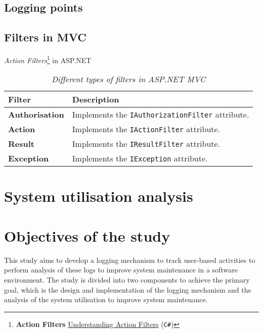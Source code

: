 \subsection{Logging points}\label{sec:Ch1_LoggignPoints}

\subsection{Filters in MVC}\label{sec:Ch1_FiltersMVC}

\emph{Action Filters}\cprotect\footnote{\textbf{Action Filters} \href{https://docs.microsoft.com/en-us/aspnet/mvc/overview/older-versions-1/controllers-and-routing/understanding-action-filters-cs}{Understanding Action Filters} (\verb|C#|)} in ASP.NET

\begin{table}[!htb]
	\centering
	\small
	\caption[Different types of filters in ASP.NET MVC]
	{\textit{Different types of filters in ASP.NET MVC}}
	\label{tbl:Ch1_ASPFilters}
	\begin{tabularx}{\textwidth}{|l|X|}
		\hline \textbf{Filter} & \textbf{Description} \\
		\hline \textbf{Authorisation} & Implements the \texttt{IAuthorizationFilter} attribute. \\
		\hline \textbf{Action} & Implements the \texttt{IActionFilter} attribute. \\
		\hline \textbf{Result} & Implements the \texttt{IResultFilter} attribute. \\
		\hline \textbf{Exception} & Implements the \texttt{IException} attribute. \\
		\hline
	\end{tabularx}
\end{table}

\clearpage

\section{System utilisation analysis}\label{sec:SystemUtilisation}

\clearpage

\section{Objectives of the study}
This study aims to develop a logging mechanism to track user-based activities to perform analysis of these logs to improve system maintenance in a software environment. The study is divided into two components to achieve the primary goal, which is the design and implementation of the logging mechanism and the analysis of the system utilisation to improve system maintenance.

